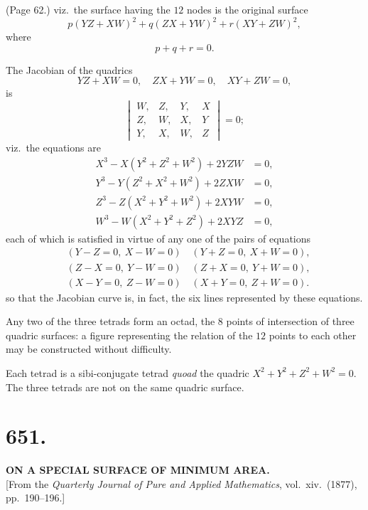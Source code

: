 \documentclass[11pt,a4paper]{article}
\begin{document}
\bigskip

\noindent (Page 62.) viz.\ the surface having the $12$ nodes is the original surface
\[
p(YZ + XW)^2 + q(ZX + YW)^2 + r(XY + ZW)^2,
\]
where
\[
p + q + r = 0.
\]

The Jacobian of the quadrics
\[
YZ + XW = 0,\quad ZX + YW = 0,\quad XY + ZW = 0,
\]
is
\[
\begin{vmatrix} W, & Z, & Y, & X \\ Z, & W, & X, & Y \\ Y, & X, & W, & Z \end{vmatrix} = 0;
\]
viz.\ the equations are
\begin{align*}
X^3 - X(Y^2 + Z^2 + W^2) + 2YZW &= 0, \\
Y^3 - Y(Z^2 + X^2 + W^2) + 2ZXW &= 0, \\
Z^3 - Z(X^2 + Y^2 + W^2) + 2XYW &= 0, \\
W^3 - W(X^2 + Y^2 + Z^2) + 2XYZ &= 0,
\end{align*}
each of which is satisfied in virtue of any one of the pairs of equations
\begin{align*}
& (Y - Z = 0,\ X - W = 0)\quad (Y + Z = 0,\ X + W = 0), \\
& (Z - X = 0,\ Y - W = 0)\quad (Z + X = 0,\ Y + W = 0), \\
& (X - Y = 0,\ Z - W = 0)\quad (X + Y = 0,\ Z + W = 0).
\end{align*}
so that the Jacobian curve is, in fact, the six lines represented by these equations.

Any two of the three tetrads form an octad, the $8$ points of intersection of three quadric surfaces: a figure representing the relation of the $12$ points to each other may be constructed without difficulty.

Each tetrad is a sibi-conjugate tetrad \textit{quoad} the quadric $X^2 + Y^2 + Z^2 + W^2 = 0$. The three tetrads are not on the same quadric surface.

\bigskip


\section*{651.}

\begin{center}
\textbf{ON A SPECIAL SURFACE OF MINIMUM AREA.}\\[1em]
[From the \textit{Quarterly Journal of Pure and Applied Mathematics}, vol.~xiv.\ (1877), pp.~190--196.]
\end{center}
\end{document}
